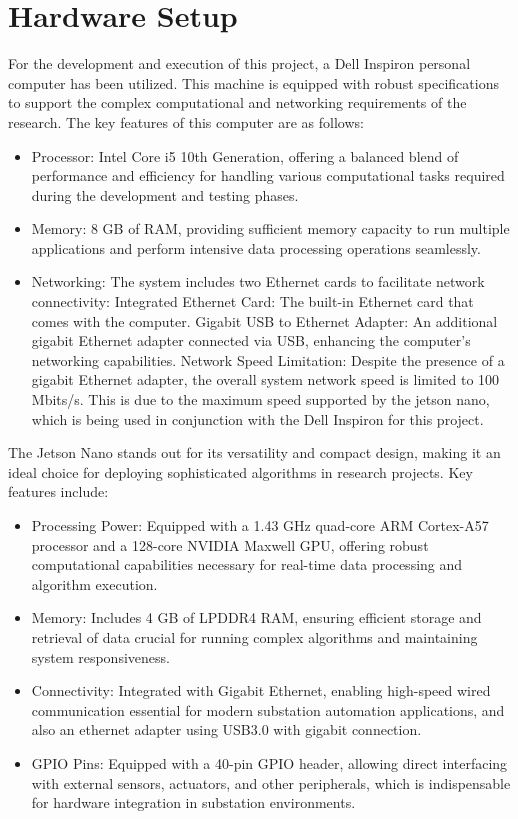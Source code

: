 \section{Hardware Setup}

For the development and execution of this project, a Dell Inspiron personal computer has been utilized. This machine is equipped with robust specifications to support the complex computational and networking requirements of the research. The key features of this computer are as follows:

\begin{itemize}
	\item Processor: Intel Core i5 10th Generation, offering a balanced blend of performance and efficiency for handling various computational tasks required during the development and testing phases.
	\item Memory: 8 GB of RAM, providing sufficient memory capacity to run multiple applications and perform intensive data processing operations seamlessly.
	\item Networking: The system includes two Ethernet cards to facilitate network connectivity:
	Integrated Ethernet Card: The built-in Ethernet card that comes with the computer.
	Gigabit USB to Ethernet Adapter: An additional gigabit Ethernet adapter connected via USB, enhancing the computer’s networking capabilities.
	Network Speed Limitation: Despite the presence of a gigabit Ethernet adapter, the overall system network speed is limited to 100 Mbits/s. This is due to the maximum speed supported by the jetson nano, which is being used in conjunction with the Dell Inspiron for this project.
\end{itemize} 

The Jetson Nano stands out for its versatility and compact design, making it an ideal choice for deploying sophisticated algorithms in research projects. Key features include:

\begin{itemize}
	\item Processing Power: Equipped with a 1.43 GHz quad-core ARM Cortex-A57 processor and a 128-core NVIDIA Maxwell GPU, offering robust computational capabilities necessary for real-time data processing and algorithm execution.
	\item Memory: Includes 4 GB of LPDDR4 RAM, ensuring efficient storage and retrieval of data crucial for running complex algorithms and maintaining system responsiveness.
	\item Connectivity: Integrated with Gigabit Ethernet, enabling high-speed wired communication essential for modern substation automation applications, and also an ethernet adapter using USB3.0 with gigabit connection.
	\item GPIO Pins: Equipped with a 40-pin GPIO header, allowing direct interfacing with external sensors, actuators, and other peripherals, which is indispensable for hardware integration in substation environments.
\end{itemize}

